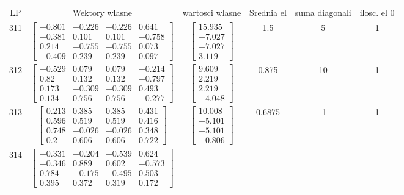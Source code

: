\documentclass[a4paper,12pt]{article}
\begin{document}
\bgroup {} \vspace{0.2in} \begin{tabular}{c c c c c c}
LP &Wektory wlasne & wartosci wlasne & Srednia el & suma diagonali & ilosc. el 0\\
311
&
$\begin{bmatrix} -0.801 & -0.226 & -0.226 & 0.641 \\ -0.381 & 0.101 & 0.101 & -0.758 \\ 0.214 & -0.755 & -0.755 & 0.073 \\ -0.409 & 0.239 & 0.239 & 0.097 \end{bmatrix}$
&
$\begin{bmatrix} 15.935 \\ -7.027 \\ -7.027 \\ 3.119 \end{bmatrix}$
&
1.5
&
5
&
1
\\
312
&
$\begin{bmatrix} -0.529 & 0.079 & 0.079 & -0.214 \\ 0.82 & 0.132 & 0.132 & -0.797 \\ 0.173 & -0.309 & -0.309 & 0.493 \\ 0.134 & 0.756 & 0.756 & -0.277 \end{bmatrix}$
&
$\begin{bmatrix} 9.609 \\ 2.219 \\ 2.219 \\ -4.048 \end{bmatrix}$
&
0.875
&
10
&
1
\\
313
&
$\begin{bmatrix} 0.213 & 0.385 & 0.385 & 0.431 \\ 0.596 & 0.519 & 0.519 & 0.416 \\ 0.748 & -0.026 & -0.026 & 0.348 \\ 0.2 & 0.606 & 0.606 & 0.722 \end{bmatrix}$
&
$\begin{bmatrix} 10.008 \\ -5.101 \\ -5.101 \\ -0.806 \end{bmatrix}$
&
0.6875
&
-1
&
1
\\
314
&
$\begin{bmatrix} -0.331 & -0.204 & -0.539 & 0.624 \\ -0.346 & 0.889 & 0.602 & -0.573 \\ 0.784 & -0.175 & -0.495 & 0.503 \\ 0.395 & 0.372 & 0.319 & 0.172 \end{bmatrix}$

\end{tabular}
\end{document}
